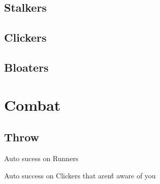 \documentclass[10pt,twoside,twocolumn]{book}
\begin{document}
\section{Stalkers}

\section{Clickers}

\section{Bloaters}

%
%
\mainmatter
\chapter{Combat}

\section{Throw}

\begin{rpg-list}
    \item Auto sucess on Runners
    \item Auto success on Clickers that aren\'t aware of you
\end{rpg-list}

\end{document}
